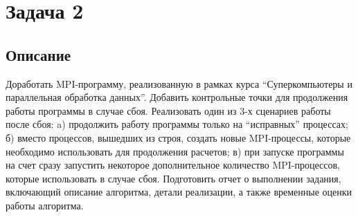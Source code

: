 \documentclass[a4paper,12pt,titlepage,final]{article}
\begin{document}
\section{Задача 2}
\subsection{Описание}
Доработать MPI-программу, реализованную в рамках курса “Суперкомпьютеры и параллельная обработка данных”. Добавить контрольные точки для продолжения работы программы в случае сбоя. Реализовать один из 3-х сценариев работы после сбоя: a) продолжить работу программы только на “исправных” процессах; б) вместо процессов, вышедших из строя, создать новые MPI-процессы, которые необходимо использовать для продолжения расчетов; в) при запуске программы на счет сразу запустить некоторое дополнительное количество MPI-процессов, которые использовать в случае сбоя.
Подготовить отчет о выполнении задания, включающий описание алгоритма, детали реализации, а также временные оценки работы алгоритма.
\end{document}

